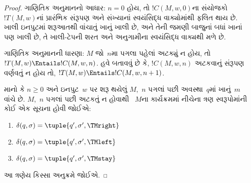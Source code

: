 \documentclass[../../../include/open-logic-section]{subfiles}
\begin{document}
\begin{proof}
ગાણિતિક અનુમાનનો આધાર: $n = 0$ હોય, તો
$!C(M, w, 0)$ના સંયોજકો~$!T(M,w)$નાં
પ્રારંભિક સંરૂપણ અને સંખ્યાનાં સ્વયંસિદ્ધ વાક્યોમાંથી
ફલિત થાય છે. ખાલી ઇનપુટમાં શરૂઆતથી વાંચાતું
ખાનું ખાલી છે, અને તેની જમણી બાજુનાં બધાં
ખાનાં પણ ખાલી છે, તે ખાલી-ટેપની શરત અને
અનુગામીના સ્વયંસિદ્ધ વાક્યથી મળે છે.

ગાણિતિક અનુમાનની ધારણા: $M$ જો~$n$મા પગલા પહેલાં
અટક્યું ન હોય, તો $!T(M,w) \Entails !C(M, w, n)$.
હવે બતાવવું છે કે, $!C(M, w, n)$ અટકવાનું સંરૂપણ
વર્ણવતું ન હોય તો,
$!T(M, w) \Entails !C(M, w, n+1)$.

માનો કે $n \ge 0$ અને ઇનપુટ~$w$ પર શરૂ થયેલું
$M$,~$n$ પગલાં પછી અવસ્થા~$q$માં ખાનું~$m$
વાંચે છે. $M$,~$n$ પગલાં પછી અટકતું ન હોવાથી
~$M$ના કાર્યક્રમમાં નીચેના ત્રણ સ્વરૂપોમાંની કોઈ એક
સૂચના હોવી જોઈએ:

\begin{enumerate}
\item {} $\delta(q, \sigma) = \tuple{q', \sigma', \TMright}$

\item {} $\delta(q, \sigma) = \tuple{q', \sigma', \TMleft}$

\item {} $\delta(q, \sigma) = \tuple{q', \sigma', \TMstay}$
\end{enumerate}

આ ત્રણેય કિસ્સા અનુક્રમે જોઈએ.


\end{proof}
\end{document}
